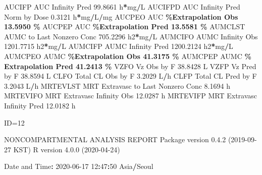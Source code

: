 \documentclass[
  12pt,
]{krantz}
\newenvironment{Shaded}{\begin{snugshade}}{\end{snugshade}}
\newcommand{\DecValTok}[1]{\textcolor[rgb]{0.00,0.00,0.81}{#1}}
\newcommand{\FloatTok}[1]{\textcolor[rgb]{0.00,0.00,0.81}{#1}}
\newcommand{\NormalTok}[1]{#1}
\newcommand{\OperatorTok}[1]{\textcolor[rgb]{0.81,0.36,0.00}{\textbf{#1}}}
\newcommand{\StringTok}[1]{\textcolor[rgb]{0.31,0.60,0.02}{#1}}
\begin{document}
\begin{Shaded}
\begin{Highlighting}[]
\NormalTok{AUCIFP     AUC Infinity Pred                              }\FloatTok{99.8661}\NormalTok{ h}\OperatorTok{*}\NormalTok{mg}\OperatorTok{/}\NormalTok{L}
\NormalTok{AUCIFPD    AUC Infinity Pred Norm by Dose                  }\FloatTok{0.3121}\NormalTok{ h}\OperatorTok{*}\NormalTok{mg}\OperatorTok{/}\NormalTok{L}\OperatorTok{/}\NormalTok{mg}
\NormalTok{AUCPEO     AUC }\OperatorTok{\%Extrapolation Obs                         13.5950 \%}
\NormalTok{AUCPEP     AUC }\OperatorTok{\%Extrapolation Pred                        13.5581 \%}
\NormalTok{AUMCLST    AUMC to Last Nonzero Conc                     }\FloatTok{705.2296}\NormalTok{ h2}\OperatorTok{*}\NormalTok{mg}\OperatorTok{/}\NormalTok{L}
\NormalTok{AUMCIFO    AUMC Infinity Obs                            }\FloatTok{1201.7715}\NormalTok{ h2}\OperatorTok{*}\NormalTok{mg}\OperatorTok{/}\NormalTok{L}
\NormalTok{AUMCIFP    AUMC Infinity Pred                           }\FloatTok{1200.2124}\NormalTok{ h2}\OperatorTok{*}\NormalTok{mg}\OperatorTok{/}\NormalTok{L}
\NormalTok{AUMCPEO    AUMC }\OperatorTok{\%Extrapolation Obs                        41.3175 \%}
\NormalTok{AUMCPEP    AUMC }\OperatorTok{\% Extrapolation Pred                      41.2413 \%}
\NormalTok{VZFO       Vz Obs by F                                    }\FloatTok{38.8428}\NormalTok{ L}
\NormalTok{VZFP       Vz Pred by F                                   }\FloatTok{38.8594}\NormalTok{ L}
\NormalTok{CLFO       Total CL Obs by F                               }\FloatTok{3.2029}\NormalTok{ L}\OperatorTok{/}\NormalTok{h}
\NormalTok{CLFP       Total CL Pred by F                              }\FloatTok{3.2043}\NormalTok{ L}\OperatorTok{/}\NormalTok{h}
\NormalTok{MRTEVLST   MRT Extravasc to Last Nonzero Conc              }\FloatTok{8.1694}\NormalTok{ h}
\NormalTok{MRTEVIFO   MRT Extravasc Infinity Obs                     }\FloatTok{12.0287}\NormalTok{ h}
\NormalTok{MRTEVIFP   MRT Extravasc Infinity Pred                    }\FloatTok{12.0182}\NormalTok{ h}





\NormalTok{ID=}\DecValTok{12}

\NormalTok{                        NONCOMPARTMENTAL ANALYSIS REPORT}
\NormalTok{                       Package version }\DecValTok{0}\NormalTok{.}\FloatTok{4.2}\NormalTok{ (}\DecValTok{2019{-}09{-}27}\NormalTok{ KST)}
\NormalTok{                          R version }\DecValTok{4}\NormalTok{.}\FloatTok{0.0}\NormalTok{ (}\DecValTok{2020{-}04{-}24}\NormalTok{)}

\NormalTok{Date and Time}\OperatorTok{:}\StringTok{ }\DecValTok{2020{-}06{-}17} \DecValTok{12}\OperatorTok{:}\DecValTok{47}\OperatorTok{:}\DecValTok{50}\NormalTok{ Asia}\OperatorTok{/}\NormalTok{Seoul}


\end{Highlighting}
\end{Shaded}
\end{document}
